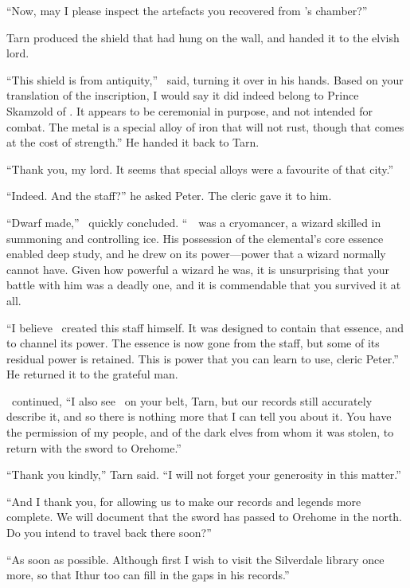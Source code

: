 ``Now, may I please inspect the artefacts you recovered from \mothzam's chamber?''

Tarn produced the shield that had hung on the wall, and handed it to the elvish lord.

``This shield is from antiquity,'' \arilor\ said, turning it over in his hands.  Based on your translation of the inscription, I would say it did indeed belong to Prince Skamzold of \atmudarant.  It appears to be ceremonial in purpose, and not intended for combat.  The metal is a special alloy of iron that will not rust, though that comes at the cost of strength.''  He handed it back to Tarn.

``Thank you, my lord.  It seems that special alloys were a favourite of that city.''

``Indeed.  And the staff?''  he asked Peter.  The cleric gave it to him.

``Dwarf made,'' \arilor\ quickly concluded.  ``\mothzam\ \driktur\ was a cryomancer, a wizard skilled in summoning and controlling ice.  His possession of the elemental's core essence enabled deep study, and he drew on its power---power that a wizard normally cannot have.  Given how powerful a wizard he was, it is unsurprising that your battle with him was a deadly one, and it is commendable that you survived it at all.

``I believe \mothzam\ created this staff himself.  It was designed to contain that essence, and to channel its power.  The essence is now gone from the staff, but some of its residual power is retained.  This is power that you can learn to use, cleric Peter.''  He returned it to the grateful man.

\arilor\ continued, ``I also see \kildir\ on your belt, Tarn, but our records still accurately describe it, and so there is nothing more that I can tell you about it.  You have the permission of my people, and of the dark elves from whom it was stolen, to return with the sword to Orehome.''

``Thank you kindly,'' Tarn said.  ``I will not forget your generosity in this matter.''

``And I thank you, for allowing us to make our records and legends more complete.  We will document that the sword has passed to Orehome in the north.  Do you intend to travel back there soon?''

``As soon as possible.  Although first I wish to visit the Silverdale library once more, so that Ithur too can fill in the gaps in his records.''

